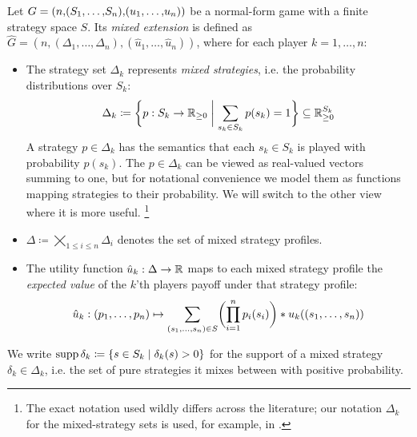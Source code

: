 \documentclass[a4paper]{scrreprt}
\newcommand{\Rp}{\mathbb{R}_{\geq 0}}
\begin{document}
    \begin{defn}
        Let $G = (n{\tiny, }(S_1{\tiny,\dots,}S_n){\tiny, }(u_1{\tiny,\dots,}u_n))$ be a normal-form game with a finite strategy space $S$.
        Its \emph{mixed extension} is defined as $\hat{G} = (n, (\Delta_1, \dots, \Delta_n), (\hat{u}_1, \dots, \hat{u}_n))$,
        where for each player $k = 1,\dots,n$:
        \begin{itemize}
            \item 
            The strategy set $\Delta_k$ represents \emph{mixed strategies}, i.e. the probability distributions over $S_k$:
            \[
                \Delta_k \coloneqq \biggset{ p : S_k \to \Rp \biggmid \sum_{s_k \in S_k} p(s_k) = 1 } \subseteq \Rp^{S_k}
            \]
            A strategy $p \in \Delta_k$ has the semantics that each $s_k \in S_k$ is played with probability $p(s_k)$.
            The $p \in \Delta_k$ can be viewed as real-valued vectors summing to one, but for notational convenience we model them as functions mapping strategies to their probability. We will switch to the other view where it is more useful.
            \footnote{The exact notation used wildly differs across the literature; our notation $\Delta_k$ for the mixed-strategy sets is used, for example, in \cite{bib:quantPropernessProtectiveness}.}
            
            \item $\Delta \coloneqq \bigtimes\limits_{1\leq i \leq n} \Delta_i$ denotes the set of mixed strategy profiles.
            
            \item
            The utility function $\hat{u}_k: \Delta \to \mathbb{R}$ maps to each mixed strategy profile the \emph{expected value} of the $k$'th players payoff under that strategy profile:
            \begin{gather}
                \hat{u}_k: 
                (p_1, \dots, p_n) 
                \mapsto
                \sum_{(s_1, \dots, s_n) \in S} \biggl(\prod_{i=1}^{n} p_i(s_i)\biggr) * u_k( (s_1, \dots, s_n) )
                \label{eq:mixedStrategyUtility}
            \end{gather}
        \end{itemize}
        We write $\operatorname{supp} \delta_k \coloneqq \{s \in S_k \mid \delta_k(s) > 0\}$ for the support of a mixed strategy $\delta_k \in \Delta_k$, i.e. the set of pure strategies it mixes between with positive probability.
    \end{defn}
    
\end{document}
